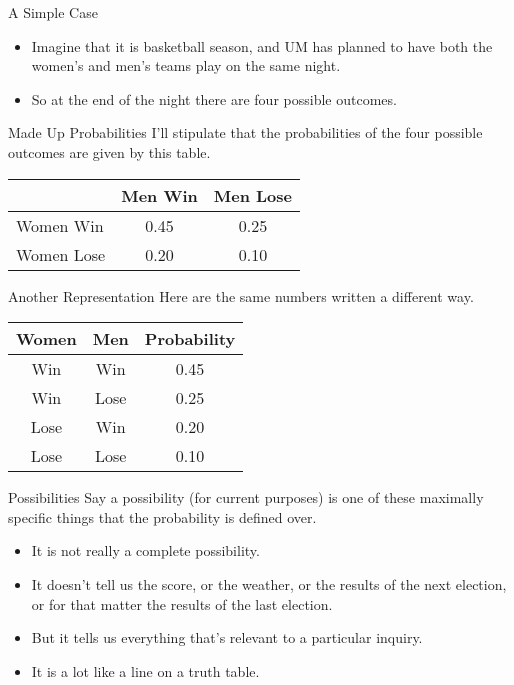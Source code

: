 \documentclass[
  ignorenonframetext,
]{beamer}
\providecommand{\tightlist}{%
  \setlength{\itemsep}{0pt}\setlength{\parskip}{0pt}}
\renewcommand{\,}{\text{, }}
\begin{document}
\begin{frame}{A Simple Case}
\protect\hypertarget{a-simple-case}{}
\begin{itemize}
\tightlist
\item
  Imagine that it is basketball season, and UM has planned to have both
  the women's and men's teams play on the same night.
\item
  So at the end of the night there are four possible outcomes.
\end{itemize}
\end{frame}

\begin{frame}{Made Up Probabilities}
\protect\hypertarget{made-up-probabilities}{}
I'll stipulate that the probabilities of the four possible outcomes are
given by this table.

\begin{longtable}[]{@{}lcc@{}}
\toprule
& Men Win & Men Lose \\
\midrule
\endhead
Women Win & 0.45 & 0.25 \\
Women Lose & 0.20 & 0.10 \\
\bottomrule
\end{longtable}
\end{frame}

\begin{frame}{Another Representation}
\protect\hypertarget{another-representation}{}
Here are the same numbers written a different way.

\begin{longtable}[]{@{}ccc@{}}
\toprule
Women & Men & Probability \\
\midrule
\endhead
Win & Win & 0.45 \\
Win & Lose & 0.25 \\
Lose & Win & 0.20 \\
Lose & Lose & 0.10 \\
\bottomrule
\end{longtable}
\end{frame}

\begin{frame}{Possibilities}
\protect\hypertarget{possibilities}{}
Say a possibility (for current purposes) is one of these maximally
specific things that the probability is defined over.

\begin{itemize}
\tightlist
\item
  It is not really a complete possibility.
\item
  It doesn't tell us the score, or the weather, or the results of the
  next election, or for that matter the results of the last election.
\item
  But it tells us everything that's relevant to a particular inquiry.
\item
  It is a lot like a line on a truth table.
\end{itemize}
\end{frame}
\end{document}
